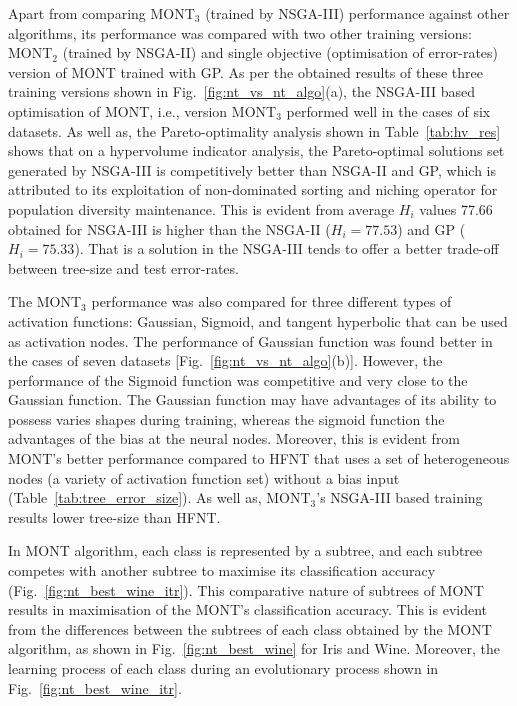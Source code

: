 \documentclass[conference]{IEEEtran}
\begin{document}
Apart from comparing MONT$_3$ (trained by NSGA-III) performance against other algorithms, its performance was compared  with two other training versions: MONT$_2$ (trained by NSGA-II) and single objective (optimisation of error-rates) version of MONT trained with GP.  As per the obtained results of these three training versions shown in Fig.~\ref{fig:nt_vs_nt_algo}(a), the NSGA-III based optimisation of MONT, i.e., version MONT$_3$ performed well in the cases of six datasets. As well as, the Pareto-optimality analysis shown in Table~\ref{tab:hv_res} shows that on a hypervolume indicator analysis, the Pareto-optimal solutions set generated by NSGA-III is competitively better than NSGA-II and GP, which is attributed to its exploitation of non-dominated sorting and niching operator for population diversity maintenance. This is evident from average $ H_i $ values 77.66 obtained for NSGA-III is higher than the NSGA-II ($ H_i = 77.53$) and GP ($ H_i = 75.33$). That is a solution in the NSGA-III tends to offer a better trade-off between tree-size and test error-rates. 

The MONT$_3$ performance was also compared for  three different types of activation functions: Gaussian, Sigmoid, and tangent hyperbolic that can be used as activation nodes. The performance of Gaussian function was found better in the cases of seven datasets [Fig.~\ref{fig:nt_vs_nt_algo}(b)]. However, the performance of the Sigmoid function was competitive and very close to the Gaussian function. The Gaussian function may have advantages of its ability to possess varies shapes during training, whereas the sigmoid function the advantages of the bias at the neural nodes.  Moreover, this is evident from MONT's better performance compared to HFNT that uses a set of heterogeneous nodes (a variety of activation function set) without a bias input (Table~\ref{tab:tree_error_size}). As well as, MONT$_3$'s NSGA-III based training results lower tree-size than HFNT.

In MONT algorithm, each class is represented by a subtree, and each subtree competes with another subtree to maximise its classification accuracy  (Fig.~\ref{fig:nt_best_wine_itr}). This comparative nature of subtrees of MONT results in maximisation of the MONT's  classification accuracy. This is evident from the differences between the subtrees of each class obtained by the MONT algorithm, as shown in Fig.~\ref{fig:nt_best_wine} for Iris and Wine. Moreover, the learning process of each class during an evolutionary process shown in Fig.~\ref{fig:nt_best_wine_itr}.
\end{document}
